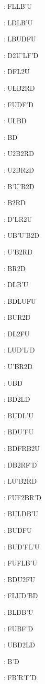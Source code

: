 \documentclass[9pt]{article}
\begin{document}
{\begin{multicols}{6}
: FLLB'U

: LDLB'U

: LBUDFU

: D2U'LF'D

: DFL2U

: ULB2RD

: FUDF'D

: ULBD

: BD

: U2B2RD

: U2BR2D

: B'U'B2D

: B2RD

: D'LR2U

: UB'U'B2D

: U'B2RD

: BR2D

: DLB'U

: BDLUFU

: BUR2D

: DL2FU

: LUD'L'D

: U'BR2D

: UBD

: BD2LD

: BUDL'U

: BDU'FU

: BDFRB2U

: DB2RF'D

: LU'B2RD

: FUF2BR'D

: BULDB'U

: BUDFU

: BUD'FL'U

: FUFLB'U

: BDU2FU

: FLUD'BD

: BLDB'U

: FUBF'D

: UBD2LD

: B'D

: FB'R'F'D


\end{multicols}}
\end{document}
